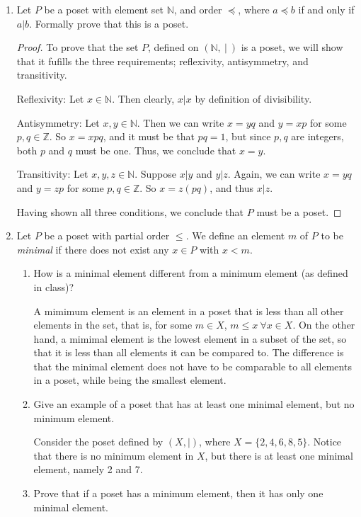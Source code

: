 \documentclass[12pt]{article}
\newcommand{\Z}{\mathbb{Z}}
\newcommand{\N}{\mathbb{N}}
\begin{document}
\begin{enumerate}
\item Let $P$ be a poset with element set $\N$, and order $\preceq$, where $a\preceq b$ if and only if $a|b$. Formally prove that this is a poset.

\begin{proof}
To prove that the set $P$, defined on $(\N,\ |\ )$ is a poset, we will show that it fufills the three requirements; reflexivity, antisymmetry, and transitivity.

Reflexivity: Let $x \in \N$. Then clearly, $x|x$ by definition of divisibility. 

Antisymmetry: Let $x, y \in \N$. Then we can write $x = yq$ and $y = xp$ for some $p, q \in \Z$. So $x = xpq$, and it must be that $pq = 1$, but since $p, q$ are integers, both $p$ and $q$ must be one. Thus, we conclude that $x = y$. 

Transitivity: Let $x, y, z \in \N$. Suppose $x | y$ and $y|z$. Again, we can write $x=yq$ and $y = zp$ for some $p, q \in \Z$. So $x = z(pq)$, and thus $x|z$. 


Having shown all three conditions, we conclude that $P$ must be a poset. 
\end{proof}

\item Let $P$ be a poset with partial order $\leq$. We define an element $m$ of $P$ to be {\it minimal} if there does not exist any $x\in P$ with $x<m$.
\begin{enumerate}
\item How is a minimal element different from a minimum element (as defined in class)?

A mimimum element is an element in a poset that is less than all other elements in the set, that is, for some $m\in X$, $m \leq x\ \forall x \in X$. On the other hand, a mimimal element is the lowest element in a subset of the set, so that it is less than all elements it can be compared to. The difference is that the minimal element does not have to be comparable to all elements in a poset, while being the smallest element. 

\item Give an example of a poset that has at least one minimal element, but no minimum element.

Consider the poset defined by $(X,|)$, where $X = \{2, 4, 6, 8, 5\}$. Notice that there is no minimum element in $X$, but there is at least one minimal element, namely 2 and 7.  

\item Prove that if a poset has a minimum element, then it has only one minimal element.


\end{enumerate}
\end{enumerate}
\end{document}
